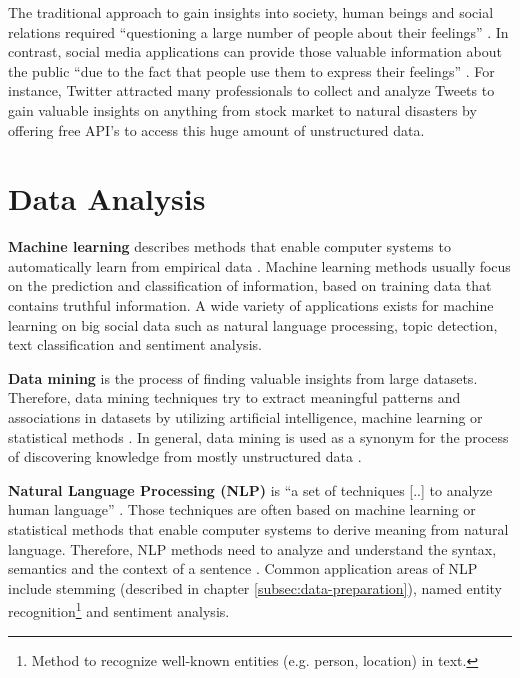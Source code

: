 The traditional approach to gain insights into society, human beings and social relations required \enquote{questioning a large number of people about their feelings} \cite[1]{flaounas2012big}. In contrast, social media applications can provide those valuable information about the public \enquote{due to the fact that people use them to express their feelings} \cite[1]{flaounas2012big}. For instance, Twitter attracted many professionals to collect and analyze Tweets to gain valuable insights on anything from stock market to natural disasters by offering free API’s to access this huge amount of unstructured data.

\section{Data Analysis}
\label{sec:data-analysis}

\textbf{Machine learning} describes methods that enable computer systems to automatically learn from empirical data \cite{Domingos:2012:FUT:2347736.2347755,McKinsey2011}. Machine learning methods usually focus on the prediction and classification of information, based on training data that contains truthful information. A wide variety of applications exists for machine learning on big social data such as natural language processing, topic detection, text classification and sentiment analysis.

\vspace{10 mm}
\textbf{Data mining} is the process of finding valuable insights from large datasets. Therefore, data mining techniques try to extract meaningful patterns and associations in datasets by utilizing artificial intelligence, machine learning or statistical methods \cite{han2012mining}. In general, data mining is used as a synonym for the process of discovering knowledge from mostly unstructured data \cite[6\psqq]{han2012mining}.

\vspace{10 mm}
\textbf{Natural Language Processing (NLP)} is \enquote{a set of techniques [..] to analyze human language} \cite[29]{McKinsey2011}. Those techniques are often based on machine learning or statistical methods that enable computer systems to derive meaning from natural language. Therefore, NLP methods need to analyze and understand the syntax, semantics and the context of a sentence \cite{Linckels:2011:ESU:1995306}. Common application areas of NLP include stemming (described in chapter \ref{subsec:data-preparation}), named entity  recognition\footnote{Method to recognize well-known entities (e.g. person, location) in text.} and sentiment analysis.

